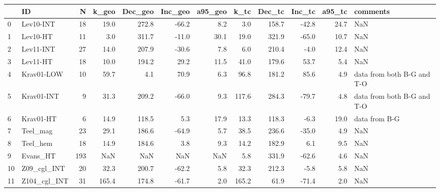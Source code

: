 \documentclass[11pt]{article}
\begin{document}
    \begin{sidewaystable}
    {\tiny\begin{tabular}{llrrrrrrrrrl}
\toprule
{} &            ID &    N &  k\_geo &  Dec\_geo &  Inc\_geo &  a95\_geo &   k\_tc &  Dec\_tc &  Inc\_tc &  a95\_tc &                    comments \\
\midrule
0  &     Lev10-INT &   18 &   19.0 &    272.8 &    -66.2 &      8.2 &    3.0 &   158.7 &   -42.8 &    24.7 &                         NaN \\
1  &      Lev10-HT &   11 &    3.0 &    311.7 &    -11.0 &     30.1 &   19.0 &   321.9 &   -65.0 &    10.7 &                         NaN \\
2  &     Lev11-INT &   27 &   14.0 &    207.9 &    -30.6 &      7.8 &    6.0 &   210.4 &    -4.0 &    12.4 &                         NaN \\
3  &      Lev11-HT &   18 &   10.0 &    194.2 &     29.2 &     11.5 &   41.0 &   179.6 &    53.7 &     5.4 &                         NaN \\
4  &    Krav01-LOW &   10 &   59.7 &      4.1 &     70.9 &      6.3 &   96.8 &   181.2 &    85.6 &     4.9 &  data from both B-G and T-O \\
5  &    Krav01-INT &    9 &   31.3 &    209.2 &    -66.0 &      9.3 &  117.6 &   284.3 &   -79.7 &     4.8 &  data from both B-G and T-O \\
6  &     Krav01-HT &    6 &   14.9 &    118.5 &      5.3 &     17.9 &   13.3 &   118.3 &    -6.3 &    19.0 &               data from B-G \\
7  &      Teel\_mag &   23 &   29.1 &    186.6 &    -64.9 &      5.7 &   38.5 &   236.6 &   -35.0 &     4.9 &                         NaN \\
8  &      Teel\_hem &   18 &   14.9 &    184.6 &      3.8 &      9.3 &   14.2 &   182.9 &     6.1 &     9.5 &                         NaN \\
9  &      Evans\_HT &  193 &    NaN &      NaN &      NaN &      NaN &    5.8 &   331.9 &   -62.6 &     4.6 &                         NaN \\
10 &   Z09\_cgl\_INT &   20 &   32.3 &    200.7 &    -62.2 &      5.8 &   32.3 &   212.3 &    -5.8 &     5.8 &                         NaN \\
11 &  Z104\_cgl\_INT &   31 &  165.4 &    174.8 &    -61.7 &      2.0 &  165.2 &    61.9 &   -71.4 &     2.0 &                         NaN \\
\bottomrule
\end{tabular}}
\end{sidewaystable}
    
\end{document}

